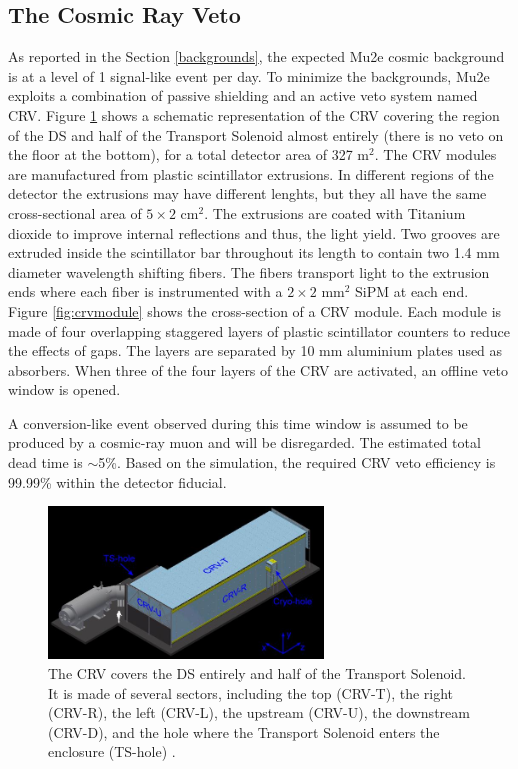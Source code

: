 \subsection{The Cosmic Ray Veto}\label{CRV}
As reported in the Section \ref{backgrounds}, the expected Mu2e 
cosmic background is at a level of 1 signal-like event per day. 
To minimize the backgrounds, Mu2e exploits a combination of passive shielding and an active 
veto system named CRV. Figure \ref{fig:crv} shows a 
schematic representation of 
the CRV covering the region of the DS and half of the Transport Solenoid 
almost entirely (there is no veto on the floor at the bottom), for a total detector area
of 327 m$^2$.
The CRV modules are manufactured from plastic scintillator extrusions. 
In different regions of the detector the extrusions may have different lenghts, 
but they all have the same cross-sectional area of $5 \times 2$ cm$^2$.
The extrusions 
are coated with Titanium dioxide to improve internal reflections and thus, the light yield. 
Two grooves are extruded inside the scintillator bar throughout its length to contain two 
1.4 mm diameter wavelength shifting fibers. The fibers transport light to the extrusion 
ends where each fiber is instrumented with a $2 \times 2$ mm$^2$ SiPM at each end. Figure \ref{fig:crvmodule} 
shows the cross-section of a CRV module. Each module is made of four overlapping staggered layers 
of plastic scintillator counters to reduce the effects of gaps. The 
layers are separated by 10 mm aluminium plates used as absorbers. 
When three of the four layers of the CRV are activated, an offline veto window is opened.

A conversion-like event observed during this time window is assumed to be produced by a cosmic-ray muon
and will be disregarded. 
The estimated total dead time is $\sim$5\%.
Based on the simulation, the required CRV veto efficiency is 99.99\% within the detector fiducial.

\begin{figure}[!h]
\centering
\includegraphics[width =0.65\textwidth]{figures/jpg/Crv_downstream.jpg}
\caption[The CRV features and components.]{The CRV covers the DS entirely and half 
of the Transport Solenoid. It is made of several sectors, including the top 
(CRV-T), the right (CRV-R), the left (CRV-L), the upstream (CRV-U), the downstream 
(CRV-D), and the hole where the Transport Solenoid enters the enclosure (TS-hole) \cite{bartoszek2015mu2e}.}
\label{fig:crv}
\end{figure}

